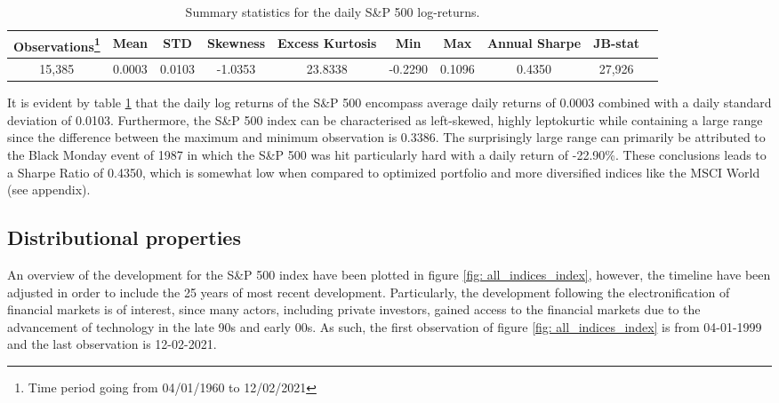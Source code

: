 \begin{table}[H]
\small
\caption{Summary statistics for the daily S\&P 500 log-returns.}
\centering
\begin{tabular}{c c c c c c c c c c} 
\hline\hline
Observations\footnote{Time period going from 04/01/1960 to 12/02/2021} & Mean & STD & Skewness & Excess Kurtosis & Min & Max & Annual Sharpe & JB-stat \\
\hline
15,385 & 0.0003 & 0.0103 & -1.0353 & 23.8338 & -0.2290 & 0.1096 & 0.4350 & 27,926 \\
\hline
\end{tabular}
\label{tab:summary_stats_S&P500}
\end{table}
 
It is evident by table \ref{tab:summary_stats_S&P500} that the daily log returns of the S\&P 500 encompass average daily returns of 0.0003 combined with a daily standard deviation of 0.0103. Furthermore, the S\&P 500 index can be characterised as left-skewed, highly leptokurtic while containing a large range since the difference between the maximum and minimum observation is 0.3386. The surprisingly large range can primarily be attributed to the Black Monday event of 1987 in which the S\&P 500 was hit particularly hard with a daily return of -22.90\%. These conclusions leads to a Sharpe Ratio of 0.4350, which is somewhat low when compared to optimized portfolio and more diversified indices like the MSCI World (see appendix).

\subsection{Distributional properties} An overview of the development for the S\&P 500 index have been plotted in figure \ref{fig: all_indices_index}, however, the timeline have been adjusted in order to include the 25 years of most recent development. Particularly, the development following the electronification of financial markets is of interest, since many actors, including private investors, gained access to the financial markets due to the advancement of technology in the late 90s and early 00s. As such, the first observation of figure \ref{fig: all_indices_index} is from 04-01-1999 and the last observation is 12-02-2021.

